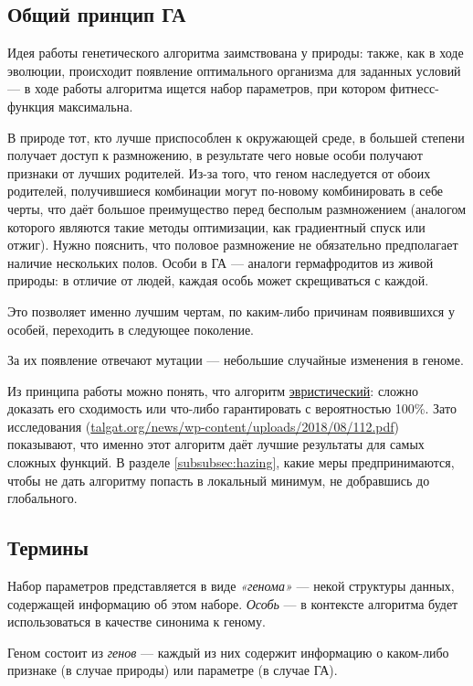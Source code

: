 \subsection{Общий принцип ГА}\label{subsec:ga_general_principles}
Идея работы генетического алгоритма заимствована у природы: также, как в ходе эволюции, происходит появление оптимального организма для заданных условий — в ходе работы алгоритма ищется набор параметров, при котором фитнесс-функция максимальна.

В природе тот, кто лучше приспособлен к окружающей среде, в большей степени получает доступ к размножению,
в результате чего новые особи получают признаки от лучших родителей.
Из-за того, что геном наследуется от обоих родителей, получившиеся комбинации могут по-новому комбинировать в себе черты,
что даёт большое преимущество перед бесполым размножением (аналогом которого являются такие методы оптимизации, как градиентный спуск или отжиг).
Нужно пояснить, что половое размножение не обязательно предполагает наличие нескольких полов.
Особи в ГА — аналоги гермафродитов из живой природы: в отличие от людей, каждая особь может скрещиваться с каждой.

Это позволяет именно лучшим чертам, по каким-либо причинам появившихся у особей, переходить в следующее поколение.

За их появление отвечают мутации — небольшие случайные изменения в геноме.

Из принципа работы можно понять, что алгоритм \href{https://en.wikipedia.org/wiki/Heuristic_(computer_science)}{эвристический}: сложно доказать его сходимость или что-либо гарантировать с вероятностью 100\%.
Зато исследования (\url{talgat.org/news/wp-content/uploads/2018/08/112.pdf}) показывают, что именно этот алгоритм даёт лучшие результаты для самых сложных функций.
В разделе \ref{subsubsec:hazing}, какие меры предпринимаются, чтобы не дать алгоритму попасть в локальный минимум, не добравшись до глобального.

\subsection{Термины}\label{subsec:ga_principles}
Набор параметров представляется в виде \textit{«генома»} — некой структуры данных, содержащей информацию об этом наборе.
\textit{Особь} — в контексте алгоритма будет использоваться в качестве синонима к геному.

Геном состоит из \textit{генов} — каждый из них содержит информацию о каком-либо признаке (в случае природы) или параметре (в случае ГА).


